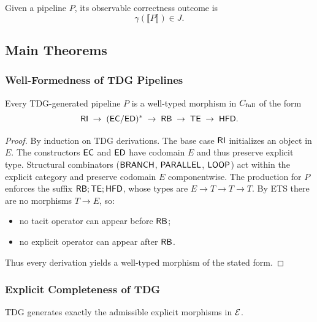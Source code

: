 \begin{definition}
Given a pipeline \(P\), its observable correctness outcome is
\[
\gamma(\llbracket P \rrbracket) \in J.
\]
\end{definition}

\subsection{Main Theorems}

\subsubsection{Well-Formedness of TDG Pipelines}

\begin{theorem}
\label{thm:well-formed}
Every TDG-generated pipeline \(P\) is a well-typed morphism in \(C_{\mathrm{full}}\) of
the form
\[
\mathsf{RI} \;\to\; (\mathsf{EC}/\mathsf{ED})^{\ast} \;\to\; \mathsf{RB} \;\to\; \mathsf{TE} \;\to\; \mathsf{HFD}.
\]
\end{theorem}

\begin{proof}
By induction on TDG derivations. The base case \(\mathsf{RI}\) initializes an object
in \(E\). The constructors \(\mathsf{EC}\) and \(\mathsf{ED}\) have codomain \(E\) and thus
preserve explicit type. Structural combinators (\(\mathsf{BRANCH}\), \(\mathsf{PARALLEL}\),
\(\mathsf{LOOP}\)) act within the explicit category and preserve codomain \(E\)
componentwise. The production for \(P\) enforces the suffix
\(\mathsf{RB}; \mathsf{TE}; \mathsf{HFD}\), whose types are \(E \to T \to T \to T\).
By ETS there are no morphisms \(T \to E\), so:
\begin{itemize}
  \item no tacit operator can appear before \(\mathsf{RB}\);
  \item no explicit operator can appear after \(\mathsf{RB}\).
\end{itemize}
Thus every derivation yields a well-typed morphism of the stated form.
\end{proof}

\subsubsection{Explicit Completeness of TDG}

\begin{theorem}
\label{thm:explicit-completeness}
TDG generates exactly the admissible explicit morphisms in \(\mathcal{E}\).
\end{theorem}

